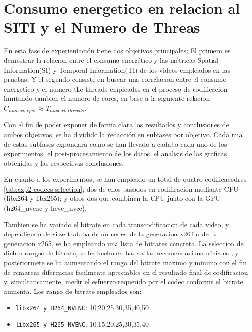 \section{Consumo energetico en relacion al SITI y el Numero de Threas}\label{exp2-desarrollo}

En esta fase de experientación tiene dos objetivos principales; El primero es demostrar la relacion entre el consumo energético y las métricas Spatial Information(SI) y Temporal Information(TI) de los videos empleados en las pruebas; Y el segundo consiste en buscar una correlacion entre el consumo energetico y el numero the threads empleados en el proceso de codificacion limitando tambien el numero de cores, en base a la siguiente relacion $C_{numero\_cpus}\approx T_{numero\_threads}$. 

Con el fin de poder exponer de forma clara los resultados y conclusiones de ambos objetivos, se ha dividido la redacción en subfases por objetivo. Cada una de estas subfases expondara como se han llevado a cadabo cada uno de los experimentos, el post-procesamiento de los datos, el analisis de las graficas obtenidas y las respectivas conclusiones. 


En cuanto a los experimentos, se han empleado un total de quatro codificacodres \ref{tab:exp2-codecs-selection}; dos de ellos basados en codificacion mediante CPU (libx264 y libx265); y otros dos que combinan la CPU junto con la GPU (h264\_nvenc y hevc\_nvec). 

Tambien se ha variado el bitrate en cada transcodificacion de cada video, y dependiendo de si se trataba de un codec de la generacion x264 o de la generacion x265, se ha empleando una lista de bitrates concreta. La seleccion de dichos rangos de bitrate, se ha hecho en base a las recomendacions oficiales \cite{bitrate-encoder-selection}, y posteriormete se ha aumentando el rango del bitrate maximo y minimo con el fin de remarcar diferencias facilmente apreciables en el resultado final de codificacion y, simultaneamente, medir el esfuerzo requerido por el codec conforme el bitrate aumenta. Los rango de bitrate empleados son:
\begin{itemize} 
 \item \texttt{libx264 y H264\_NVENC}: 10,20,25,30,35,40,50
 \item \texttt{libx265 y H265\_NVENC}: 10,15,20,25,30,35,40   
 \end{itemize}

